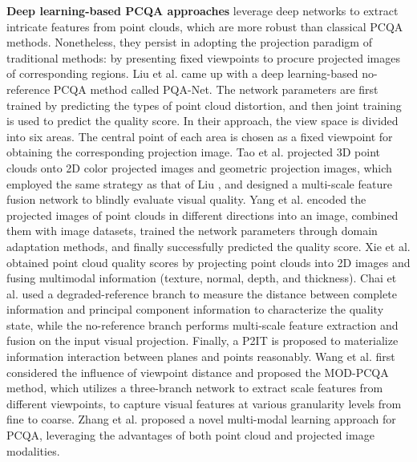 \textbf{Deep learning-based PCQA approaches} leverage deep networks to extract intricate features from point clouds, which are more robust than classical PCQA methods.
Nonetheless, they persist in adopting the projection paradigm of traditional methods: by presenting fixed viewpoints to procure projected images of corresponding regions.
Liu et al. \cite{liu12-2021-PQA-net} came up with a deep learning-based no-reference PCQA method called PQA-Net. 
The network parameters are first trained by predicting the types of point cloud distortion, and then joint training is used to predict the quality score.
In their approach, the view space is divided into six areas. The central point of each area is chosen as a fixed viewpoint for obtaining the corresponding projection image.
Tao et al. \cite{tao2021MSFC} projected 3D point clouds onto 2D color projected images and geometric projection images, which employed the same strategy as that of Liu \cite{liu12-2021-PQA-net}, and designed a multi-scale feature fusion network to blindly evaluate visual quality.
Yang et al. \cite{yang13-2022-NR-domationadapt} encoded the projected images of point clouds in different directions into an image, combined them with image datasets, trained the network parameters through domain adaptation methods, and finally successfully predicted the quality score.
Xie et al. \cite{xie2023pmBQA} obtained point cloud quality scores by projecting point clouds into 2D images and fusing multimodal information (texture, normal, depth, and thickness).
Chai et al. \cite{Chai2024} used a degraded-reference branch to measure the distance between complete information and principal component information to characterize the quality state, while the no-reference branch performs multi-scale feature extraction and fusion on the input visual projection.
Finally, a P2IT is proposed to materialize information interaction between planes and points reasonably.
Wang et al. \cite{Wang24eemf} first considered the influence of viewpoint distance and proposed the MOD-PCQA method, which utilizes a three-branch network to extract scale features from different viewpoints, to capture visual features at various granularity levels from fine to coarse.
Zhang et al. \cite{zhang2023mmpcqa} proposed a novel multi-modal learning approach for PCQA, leveraging the advantages of both point cloud and projected image modalities.


